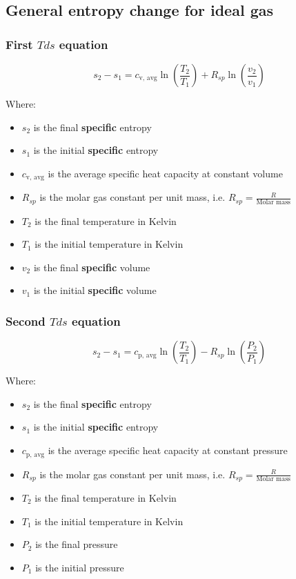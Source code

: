 \documentclass[11pt]{article}
\begin{document}
\subsection{General entropy change for ideal gas}
\label{sec:orge34c138}

\subsubsection{First \(T ds\) equation}
\label{sec:org6eccbc4}
\[s_2 - s_1 = c_{\text{v, avg}} \ln \left( \frac{T_2}{T_1} \right) + R_{sp} \ln \left(\frac{v_2}{v_1} \right)\]

Where:
\begin{itemize}
\item \(s_2\) is the final \textbf{specific} entropy
\item \(s_1\) is the initial \textbf{specific} entropy
\item \(c_{\text{v, avg}}\) is the average specific heat capacity at constant volume
\item \(R_{sp}\) is the molar gas constant per unit mass, i.e. \(R_{sp} = \frac{R}{\text{Molar mass}}\)
\item \(T_2\) is the final temperature in Kelvin
\item \(T_1\) is the initial temperature in Kelvin
\item \(v_2\) is the final \textbf{specific} volume
\item \(v_1\) is the initial \textbf{specific} volume
\end{itemize}
\subsubsection{Second \(T ds\) equation}
\label{sec:org5ca1d1f}
\[s_2 - s_1 = c_{\text{p, avg}} \ln \left( \frac{T_2}{T_1} \right) - R_{sp} \ln \left(\frac{P_2}{P_1} \right)\]

Where:
\begin{itemize}
\item \(s_2\) is the final \textbf{specific} entropy
\item \(s_1\) is the initial \textbf{specific} entropy
\item \(c_{\text{p, avg}}\) is the average specific heat capacity at constant pressure
\item \(R_{sp}\) is the molar gas constant per unit mass, i.e. \(R_{sp} = \frac{R}{\text{Molar mass}}\)
\item \(T_2\) is the final temperature in Kelvin
\item \(T_1\) is the initial temperature in Kelvin
\item \(P_2\) is the final pressure
\item \(P_1\) is the initial pressure
\end{itemize}
\end{document}
